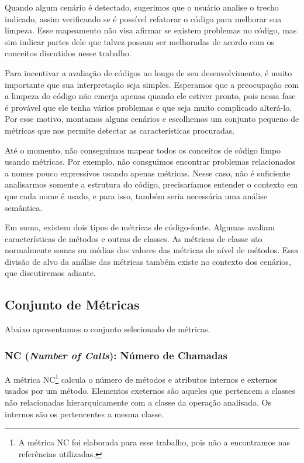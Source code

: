 Quando algum cenário é detectado, sugerimos que o usuário analise o trecho indicado, assim verificando se é possível refatorar o código para melhorar sua limpeza. Esse mapeamento não visa afirmar se existem problemas no código, mas sim indicar partes dele que talvez possam ser melhoradas de acordo com os conceitos discutidos nesse trabalho.

Para incentivar a avaliação de códigos ao longo de seu desenvolvimento, é muito importante que sua interpretação seja simples. Esperamos que a preocupação com a limpeza do código não emerja apenas quando ele estiver pronto, pois nessa fase é provável que ele tenha vários problemas e que seja muito complicado alterá-lo. Por esse motivo, montamos alguns cenários e escolhemos um conjunto pequeno de métricas que nos permite detectar as características procuradas.

Até o momento, não conseguimos mapear todos os conceitos de código limpo usando métricas. Por exemplo, não consguimos encontrar problemas relacionados a nomes pouco expressivos usando apenas métricas. Nesse caso, não é suficiente analisarmos somente a estrutura do código, precisaríamos entender o contexto em que cada nome é usado, e para isso, também seria necessária uma análise semântica.

Em suma, existem dois tipos de métricas de código-fonte. Algumas avaliam características de métodos e outras de classes. As métricas de classe são normalmente somas ou médias dos valores das métricas de nível de métodos. Essa divisão de alvo da análise das métricas também existe no contexto dos cenários, que discutiremos adiante.



\subsection{Conjunto de Métricas}

Abaixo apresentamos o conjunto selecionado de métricas.

\subsubsection{NC (\textit{Number of Calls}): Número de Chamadas}

A métrica NC\footnote{A métrica NC foi elaborada para esse trabalho, pois não a encontramos nas referências utilizadas.} calcula o número de métodos e atributos internos e externos usados por um método. Elementos exeternos são aqueles que pertencem a classes não relacionadas hierarquicamente com a classe da operação analisada. Os internos são os pertencentes a mesma classe.
                                                                 
